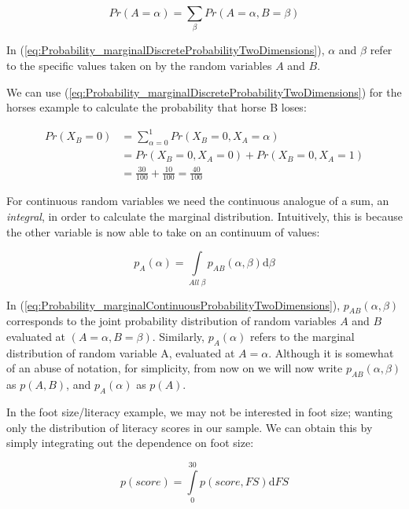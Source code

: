\documentclass[11pt,fullpage]{book}
\begin{document}
\begin{equation}\label{eq:Probability_marginalDiscreteProbabilityTwoDimensions}
Pr(A=\alpha) = \sum\limits_{\beta} Pr(A=\alpha,B=\beta)
\end{equation}

In (\ref{eq:Probability_marginalDiscreteProbabilityTwoDimensions}), $\alpha$ and $\beta$ refer to the specific values taken on by the random variables $A$ and $B$. 

We can use (\ref{eq:Probability_marginalDiscreteProbabilityTwoDimensions}) for the horses example to calculate the probability that horse B loses:

\begin{align}
Pr(X_B=0) &= \sum\limits_{\alpha=0}^{1} Pr(X_B=0,X_A=\alpha)\\
&= Pr(X_B=0,X_A=0) + Pr(X_B=0,X_A=1)\\
&= \frac{30}{100}  + \frac{10}{100}  = \frac{40}{100} 
\end{align}

For continuous random variables we need the continuous analogue of a sum, an \textit{integral}, in order to calculate the marginal distribution. Intuitively, this is because the other variable is now able to take on an continuum of values:

\begin{equation}\label{eq:Probability_marginalContinuousProbabilityTwoDimensions}
p_A(\alpha) = \int\limits_{All\;\beta} p_{AB}(\alpha,\beta) \mathrm{d}\beta
\end{equation}

In (\ref{eq:Probability_marginalContinuousProbabilityTwoDimensions}), $p_{AB}(\alpha,\beta)$ corresponds to the joint probability distribution of random variables $A$ and $B$ evaluated at $(A=\alpha,B=\beta)$. Similarly, $p_A(\alpha)$ refers to the marginal distribution of random variable A, evaluated at $A=\alpha$. Although it is somewhat of an abuse of notation, for simplicity, from now on we will now write $p_{AB}(\alpha,\beta)$ as $p(A,B)$, and $p_A(\alpha)$ as $p(A)$.

In the foot size/literacy example, we may not be interested in foot size; wanting only the distribution of literacy scores in our sample. We can obtain this by simply integrating out the dependence on foot size:

\begin{equation}\label{eq:Probability_marginalContinuousProbabilityTwoDimensionsFootExample}
p(score) = \int\limits_{0}^{30} p(score,FS) \mathrm{d}FS
\end{equation}
\end{document}
